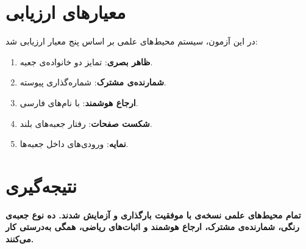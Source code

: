 \documentclass{matinbook}
\begin{document}
\section{معیارهای ارزیابی}
\label{sec:summary-criteria}

در این آزمون، سیستم محیط‌های علمی  بر اساس
پنج معیار ارزیابی شد:

\begin{enumerate}
    \item \textbf{ظاهر بصری}: تمایز دو خانواده‌ی جعبه.
    \item \textbf{شمارنده‌ی مشترک}: شماره‌گذاری پیوسته.
    \item \textbf{ارجاع هوشمند}:  با نام‌های فارسی.
    \item \textbf{شکست صفحات}: رفتار جعبه‌های بلند.
    \item \textbf{نمایه}: ورودی‌های  داخل جعبه‌ها.
\end{enumerate}

\section{نتیجه‌گیری}
\label{sec:summary-conclusion}

\textbf{تمام محیط‌های علمی  نسخه‌ی
\lr{\matinbookversion} با موفقیت بارگذاری و آزمایش شدند.
ده نوع جعبه‌ی رنگی، شمارنده‌ی مشترک، ارجاع هوشمند و
اثبات‌های ریاضی، همگی به‌درستی کار می‌کنند.}

\backmatter
\frontmattergeometry

\printbibliography[title={منابع و مراجع}]

\printindex


\end{document}
